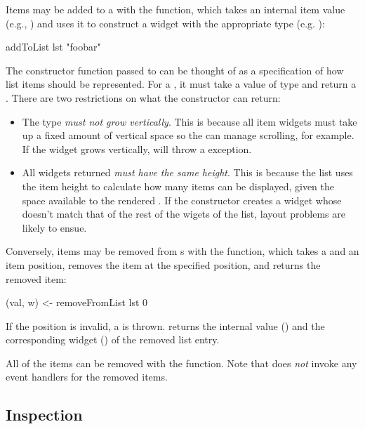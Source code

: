 Items may be added to a  with the  function,
which takes an internal item value (e.g., ) and uses it to
construct a widget with the appropriate type (e.g. ):

\begin{haskellcode}
 addToList lst "foobar"
\end{haskellcode}

The constructor function passed to  can be thought of as a
specification of how list items should be represented.  For a , it must take a value of type  and return a .  There are two restrictions on what the constructor can return:

\begin{itemize}
\item The  type \textit{must not grow vertically}.  This
  is because all  item widgets must take up a fixed amount of
  vertical space so the  can manage scrolling, for example.
  If the widget grows vertically,  will throw a
   exception.
\item All widgets returned \textit{must have the same height}.  This
  is because the list uses the item height to calculate how many items
  can be displayed, given the space available to the rendered
  .  If the constructor creates a widget whose doesn't match
  that of the rest of the wigets of the list, layout problems are
  likely to ensue.
\end{itemize}

Conversely, items may be removed from s with the
 function, which takes a  and
an item position, removes the item at the specified position, and
returns the removed item:

\begin{haskellcode}
 (val, w) <- removeFromList lst 0
\end{haskellcode}

If the position is invalid, a  is thrown.
 returns the internal value () and the
corresponding widget () of the removed list entry.

All of the items can be removed with the  function.
Note that  does \textit{not} invoke any event handlers
for the removed items.

\subsection{ Inspection}


